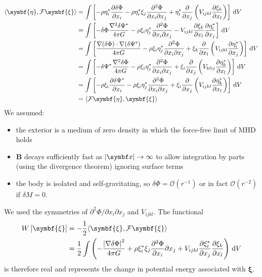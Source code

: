 \documentclass{jknotes}
\newcommand{\B}{\symbf{B}}
\newcommand{\disp}{\symbf{\xi}}
\begin{document}
\begin{align}
	\langle \symbf{\eta}, \mathcal{F} \disp \rangle 
	&= \int \left[ -\rho \eta_i^* \frac{\partial \delta \Phi}{\partial x_i} -
	\rho \eta_i^* \xi_j \frac{\partial^2 \Phi}{\partial x_i \partial x_j} +
	\eta_i^* \frac{\partial}{\partial x_j}\left( V_{ijkl} \frac{\partial
	\xi_k}{\partial x_l}\right) \right] \, \diffd V \\
	&= \int \left[ -\delta \Phi \frac{\nabla^2 \delta \Psi^*}{4\pi G} - \rho
	\xi_i \eta_j^* \frac{\partial^2 \Phi}{\partial x_i \partial x_j} -
	V_{ijkl} \frac{\partial \xi_k}{\partial x_l}\frac{\partial
	\eta_i^*}{\partial x_j} \right] \, \diffd V\\
	&= \int \left[ \frac{\nabla(\delta \Phi) \cdot \nabla(\delta \Psi^*)}{4\pi
	G} - \rho \xi_i \eta_j^* \frac{\partial^2 \Phi}{\partial x_i \partial x_j}
	+ \xi_k \frac{\partial}{\partial x_l} \left( V_{ijkl} \frac{\partial
	\eta_i^*}{\partial x_j} \right) \right] \, \diffd V \\
	&= \int \left[ -\delta \Psi^* \frac{\nabla^2 \delta \Phi}{4 \pi G} - \rho
	\xi_i \eta_j^* \frac{\partial^2 \Phi}{\partial x_i \partial x_j} + \xi_i
	\frac{\partial}{\partial x_j} \left( V_{klij} \frac{\partial
	\eta_k^*}{\partial x_l}\right) \right] \, \diffd V \\
	&= \int \left[ -\rho \xi_i \frac{\partial \delta \Psi^*}{\partial x_i} -
	\rho \xi_i \eta_j^* \frac{\partial^2 \Phi}{\partial x_i \partial x_j} +
	\xi_i \frac{\partial}{\partial x_j} \left( V_{ijkl} \frac{\partial
	\eta_k^*}{\partial x_l} \right) \right] \, \diffd V \\
	&= \langle \mathcal{F} \symbf{\eta}, \disp \rangle
\end{align}
We assumed:
\begin{itemize}
	\item the exterior is a medium of zero density in which the force-free
		limit of MHD holds
	\item $\B$ decays sufficiently fast as $\abs{\x} \to \infty$ to allow
		integration by parts (using the divergence theorem) ignoring surface
		terms
	\item the body is isolated and self-gravitating, so $\delta \Phi =
		\mathcal{O}(r^{-1})$ or in fact $\mathcal{O}(r^{-2})$ if $\delta M =
		0$.
\end{itemize}
We used the symmetries of $\partial^2 \Phi/\partial x_i \partial x_j$ and
$V_{ijkl}$. The functional
\begin{align}
	W\left[\disp\right] &= -\frac{1}{2}\langle \disp, \mathcal{F} \disp
	\rangle \\
						&= \frac{1}{2}\int \left( -\frac{\abs{\nabla \delta
						\Phi}^2}{4 \pi G} + \rho \xi_i^* \xi_j
						\frac{\partial^2 \Phi}{\partial x_i}{\partial x_j} +
						V_{ijkl} \frac{\partial \xi_i^*}{\partial x_j}
						\frac{\partial \xi_k}{\partial x_l} \right) \, \diffd
						V
\end{align}
is therefore real and represents the change in potential energy associated
with $\disp$. 
\end{document}
